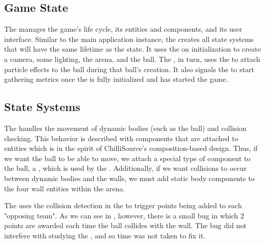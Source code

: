 \subsection{Game State}\label{ssec:game_arch_game_state}

The  manages the game's life cycle, its entities and components, and its user interface. Similar to the main application instance, the  creates all state systems that will have the same lifetime as the state. It uses the  on initialization to create a camera, some lighting, the arena, and the ball. The , in turn, uses the  to attach particle effects to the ball during that ball's creation. It also signals the  to start gathering metrics once the  is fully initialized and has started the game.

\subsection{State Systems}\label{ssec:game_arch_game_state_systems}

The  handles the movement of dynamic bodies (such as the ball) and collision checking. This behavior is described with components that are attached to entities which is in the spirit of ChilliSource's composition-based design. Thus, if we want the ball to be able to move, we attach a special type of component to the ball, a , which is used by the . Additionally, if we want collisions to occur between dynamic bodies and the walls, we must add static body components to the four wall entities within the arena.

The  uses the collision detection in the  to trigger points being added to each "opposing team". As we can see in , however, there is a small bug in which 2 points are awarded each time the ball collides with the wall. The bug did not interfere with studying the , and so time was not taken to fix it.


